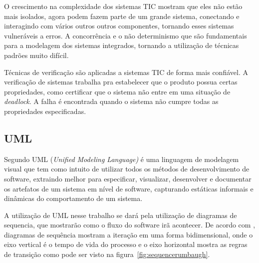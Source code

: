 O crescimento na complexidade dos sistemas TIC mostram que eles não estão mais isolados, agora podem fazem parte de um grande sistema, conectando e interagindo com vários outros outros componentes, tornando esses sistemas vulneráveis a erros. 
A concorrência e o não determinismo que são fundamentais para a modelagem dos sistemas integrados, tornando a utilização de técnicas padrões muito difícil.

Técnicas de verificação são aplicadas a sistemas TIC de forma mais confiável. A verificação de sistemas trabalha pra estabelecer que o produto possua certas propriedades, como certificar que o sistema não entre em uma situação de \textit{deadlock}. A falha é encontrada quando o sistema não cumpre todas as propriedades especificadas.



\subsection{UML}
Segundo  UML (\textit{Unified Modeling Language)} é uma linguagem de modelagem visual que tem como intuito de utilizar todos os métodos de desenvolvimento de software, extraindo melhor para especificar, visualizar, desenvolver e documentar os artefatos de um sistema em nível de software, capturando estáticas informais e dinâmicas do comportamento de um sistema.

A utilização de UML nesse trabalho se dará pela utilização de diagramas de sequencia, que mostrarão como o fluxo do software irã acontecer. De acordo com , diagramas de sequência mostram a iteração em uma forma bidimensional, onde o eixo vertical é o tempo de vida do processo e o eixo horizontal mostra as regras de transição como pode ser visto na figura~\ref{fig:sequencerumbaugh}. %

